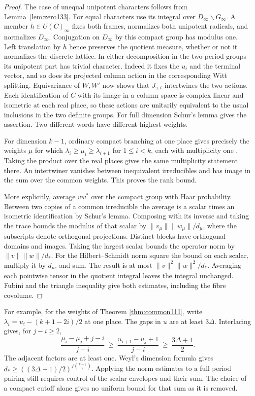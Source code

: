 \documentclass[a4paper,11pt]{article}
\theoremstyle{definition}
\theoremstyle{remark}
\numberwithin{equation}{section}
\begin{document}
\begin{proof}
The case of unequal unipotent characters follows from
Lemma~\ref{lem:zero133}. For equal characters use its integral
over \(D_\infty\backslash G_\infty\). A member \(h\in U(C)_\infty\)
fixes both frames, normalizes both unipotent radicals, and
normalizes \(D_\infty\). Conjugation on \(D_\infty\) by this
compact group has modulus one. Left translation by \(h\) hence
preserves the quotient measure, whether or not it normalizes
the discrete lattice. In either decomposition in the two period
groups its unipotent part has trivial character. Indeed it fixes
the \(u_i\) and the terminal vector, and so does its projected
column action in the corresponding Witt splitting. Equivariance
of \(W,W'\) now shows that \(J_{\gamma,t}\) intertwines the two
actions. Each identification of \(C\) with its image in a
column space is complex linear and isometric at each real place,
so these actions are unitarily equivalent to the usual
inclusions in the two definite groups. For full dimension
Schur's lemma gives the assertion. Two different words have
different highest weights.

For dimension \(k-1\), ordinary compact branching at one place
gives precisely the weights \(\mu\) for which
\(\lambda_i\ge\mu_i\ge\lambda_{i+1}\) for \(1\le i<k\), each
with multiplicity one \cite[Theorem 2.1]{XIX-XIV-IV-molev106}. Taking the
product over the real places gives the same multiplicity statement
there. An intertwiner vanishes between inequivalent irreducibles
and has image in the sum over the common weights. This proves
the rank bound.

More explicitly, average \(vw^*\) over the compact group with
Haar probability. Between two copies of a common irreducible the
average is a scalar times an isometric identification by Schur's
lemma. Composing with its inverse and taking the trace bounds
the modulus of that scalar by
\(\|v_\mu\|\|w_\mu\|/d_\mu\), where the subscripts denote
orthogonal projections. Distinct blocks have orthogonal domains
and images. Taking the largest scalar bounds the operator norm
by \(\|v\|\|w\|/d_*\). For the Hilbert--Schmidt norm square the
bound on each scalar, multiply it by \(d_\mu\), and sum. The
result is at most \(\|v\|^2\|w\|^2/d_*\).
Averaging each pointwise tensor in the quotient integral leaves
the integral unchanged. Fubini and the triangle inequality give
both estimates, including the fibre covolume.
\end{proof}

For example, for the weights of
Theorem \ref{thm:common111},
write \(\lambda_i=u_i-(k+1-2i)/2\) at one place. The gaps in
\(u\) are at least \(3\Delta\). Interlacing gives, for \(j-i\ge2\),
\[
 \frac{\mu_i-\mu_j+j-i}{j-i}
  \ \ge\ \frac{u_{i+1}-u_j+1}{j-i}
  \ \ge\ \frac{3\Delta+1}{2}.
\]
The adjacent factors are at least one. Weyl's dimension
formula gives \(d_*\ge ((3\Delta+1)/2)^{f\binom{k-2}{2}}\).
Applying the norm estimates to a full period pairing still
requires control of the scalar envelopes and their sum. The
choice of a compact cutoff alone gives no uniform bound for
that sum as it is removed.
\end{document}
